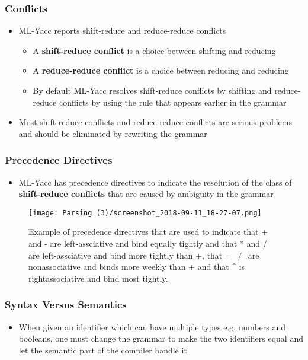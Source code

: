 \documentclass[11pt]{article}
\begin{document}
\subsubsection{Conflicts}
\label{sec:org9973bf2}
\begin{itemize}
\item ML-Yacc reports shift-reduce and reduce-reduce conflicts
\begin{itemize}
\item A \textbf{shift-reduce conflict} is a choice between shifting and reducing
\item A \textbf{reduce-reduce conflict} is a choice between reducing and reducing
\item By default ML-Yacc resolves shift-reduce conflicts by shifting and reduce-reduce conflicts by using the rule that appears earlier in the grammar
\end{itemize}

\item Most shift-reduce conflicts and reduce-reduce conflicts are serious problems and should be eliminated by rewriting the grammar
\end{itemize}

\subsubsection{Precedence Directives}
\label{sec:org7c0eb89}
\begin{itemize}
\item ML-Yacc has precedence directives to indicate the resolution of the class of \textbf{shift-reduce conflicts} that are caused by ambiguity in the grammar
\end{itemize}

\begin{figure}[htbp]
\centering
\texttt{[image: Parsing (3)/screenshot\_2018-09-11\_18-27-07.png]}
\caption{\label{fig:org139f478}
Example of precedence directives that are used to indicate that + and - are left-assciative and bind equally tightly and that * and / are left-assciative and bind more tightly than +, that = \(\ne\) are nonassociative and binds more weekly than + and that \^{} is rightassociative and bind most tightly.}
\end{figure}

\subsubsection{Syntax Versus Semantics}
\label{sec:orgec63351}
\begin{itemize}
\item When given an identifier which can have multiple types e.g. numbers and booleans, one must change the grammar to make the two identifiers equal and let the semantic part of the compiler handle it
\end{itemize}
\end{document}
